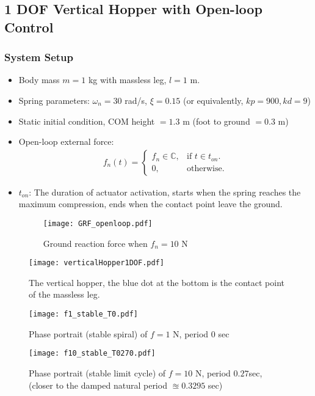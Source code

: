 \subsection{1 DOF Vertical Hopper with Open-loop Control\cite{Cham2002}}
\subsubsection*{System Setup}
\begin{itemize}
\item Body mass $m=1 $ kg with massless leg, $l=1 $ m.
\item Spring parameters: $\omega_n = 30 $ rad/s, $\xi = 0.15$ (or equivalently, $kp = 900, kd = 9$)
\item Static initial condition, COM height $= 1.3$ m (foot to ground $=0.3$ m)
\item Open-loop external force:
\begin{align*}
 f_n(t)=\begin{cases}
    f_n\in \mathbb{C}, & \text{if $t \in t_{on}$}.\\
    0, & \text{otherwise}.
  \end{cases}
\end{align*}
  \item $t_{on}$: The duration of actuator activation, starts when the spring reaches the maximum compression, ends when the contact point leave the ground.
  \begin{figure}[H]
  \centering
  \texttt{[image: GRF\_openloop.pdf]} 
  \caption{Ground reaction force when $f_n = 10$ N}
  \end{figure}
  
\end{itemize}
\begin{figure}[H]
\centering
\texttt{[image: verticalHopper1DOF.pdf]} 
\caption{The vertical hopper, the blue dot at the bottom is the contact point of the massless leg.}
\label{fig.verticalHopper1DOF}
\end{figure}

\begin{figure}[H] 
\centering
\texttt{[image: f1\_stable\_T0.pdf]} 
\caption{Phase portrait (stable spiral) of $f = 1$ N, period $0$ sec}
\end{figure}
\begin{figure}[H] 
\centering
\texttt{[image: f10\_stable\_T0270.pdf]} 
\caption{Phase portrait (stable limit cycle) of $f = 10$ N, period $0.27$sec, (closer to the damped natural period $\approxeq 0.3295$ sec)}
\end{figure}

